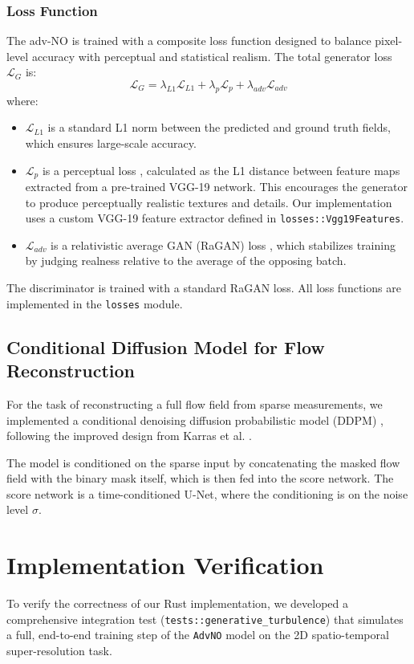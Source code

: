 \documentclass{article}
\begin{document}
\subsubsection{Loss Function}
The adv-NO is trained with a composite loss function designed to balance pixel-level accuracy with perceptual and statistical realism. The total generator loss $\mathcal{L}_G$ is:
\begin{equation}
    \mathcal{L}_G = \lambda_{L1} \mathcal{L}_{L1} + \lambda_{p} \mathcal{L}_{p} + \lambda_{adv} \mathcal{L}_{adv}
\end{equation}
where:
\begin{itemize}
    \item $\mathcal{L}_{L1}$ is a standard L1 norm between the predicted and ground truth fields, which ensures large-scale accuracy.
    \item $\mathcal{L}_{p}$ is a perceptual loss \cite{wang2018esrgan}, calculated as the L1 distance between feature maps extracted from a pre-trained VGG-19 network. This encourages the generator to produce perceptually realistic textures and details. Our implementation uses a custom VGG-19 feature extractor defined in \texttt{losses::Vgg19Features}.
    \item $\mathcal{L}_{adv}$ is a relativistic average GAN (RaGAN) loss \cite{jolicoeur2018relativistic}, which stabilizes training by judging realness relative to the average of the opposing batch.
\end{itemize}
The discriminator is trained with a standard RaGAN loss. All loss functions are implemented in the \texttt{losses} module.

\subsection{Conditional Diffusion Model for Flow Reconstruction}
For the task of reconstructing a full flow field from sparse measurements, we implemented a conditional denoising diffusion probabilistic model (DDPM) \cite{ho2020denoising}, following the improved design from Karras et al. \cite{karras2022elucidating}.

The model is conditioned on the sparse input by concatenating the masked flow field with the binary mask itself, which is then fed into the score network. The score network is a time-conditioned U-Net, where the conditioning is on the noise level $\sigma$.

\section{Implementation Verification}
To verify the correctness of our Rust implementation, we developed a comprehensive integration test (\texttt{tests::generative_turbulence}) that simulates a full, end-to-end training step of the \texttt{AdvNO} model on the 2D spatio-temporal super-resolution task.
\end{document}
